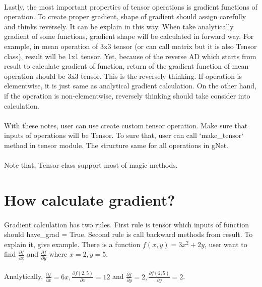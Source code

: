 \documentclass[12pt]{report}
\begin{document}
\paragraph{}
Lastly, the most important properties of tensor operations is gradient functions of operation. To create proper gradient, shape of gradient should assign carefully and thinks reversely. It can be explain in this way. When take analytically gradient of some functions, gradient shape will be calculated in forward way. For example, in mean operation of 3x3 tensor (or can call matrix but it is also Tensor class), result will be 1x1 tensor. Yet, because of the reverse AD which starts from result to calculate gradient of function, return of the gradient function of mean operation should be 3x3 tensor. This is the reversely thinking. If operation is elementwise, it is just same as analytical gradient calculation. On the other hand, if the operation is non-elementwise, reversely thinking should take consider into calculation.

\paragraph{}
With these notes, user can use create custom tensor operation. Make sure that inputs of operations will be Tensor. To sure that, user can call `make\_tensor` method in tensor module. The structure same for all operations in gNet. 


\paragraph{}
Note that, Tensor class support most of magic methods.

\section{How calculate gradient?}

\paragraph{}
Gradient calculation has two rules. First rule is tensor which inputs of function should have\_grad = True. Second rule is call backward methods from result. To explain it, give example. There is a function $f(x,y) = 3x^2 + 2y$, user want to find $\frac{\partial f}{\partial x}$ and $\frac{\partial f}{\partial y}$ where $x=2, y=5$. 

\paragraph{}
Analytically, $\frac{\partial f}{\partial x} = 6x, \frac{\partial f(2,5)}{\partial x} = 12$ and  $\frac{\partial f}{\partial y} = 2, \frac{\partial f(2,5)}{\partial y} = 2$. 
\end{document}
